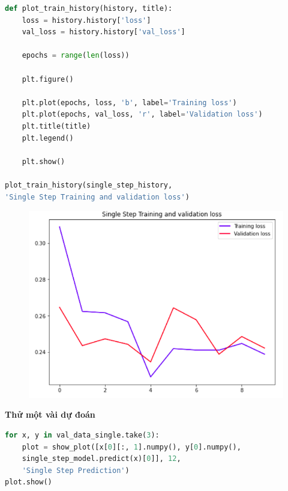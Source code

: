 \begin{lstlisting}[language=Python]
def plot_train_history(history, title):
	loss = history.history['loss']
	val_loss = history.history['val_loss']
	
	epochs = range(len(loss))
	
	plt.figure()
	
	plt.plot(epochs, loss, 'b', label='Training loss')
	plt.plot(epochs, val_loss, 'r', label='Validation loss')
	plt.title(title)
	plt.legend()
	
	plt.show()

plot_train_history(single_step_history,
'Single Step Training and validation loss')
\end{lstlisting}


\vspace{-0.75cm}
\begin{center}
	\begin{figure}[htp]
		\begin{center}
			\includegraphics[scale=0.6]{./images/8.png}
		\end{center}
	\end{figure}
\end{center}



\vspace{0.25cm}
\changefontsizes{13pt}
\setlength{\parindent}{0cm}
\textbf{Thử một vài dự đoán}


\begin{lstlisting}[language=Python]
for x, y in val_data_single.take(3):
	plot = show_plot([x[0][:, 1].numpy(), y[0].numpy(),
	single_step_model.predict(x)[0]], 12,
	'Single Step Prediction')
plot.show()
\end{lstlisting}

